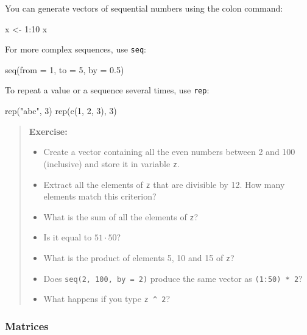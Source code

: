 \documentclass[
  letterpaper,
  DIV=11,
  numbers=noendperiod]{scrreprt}
\newenvironment{Shaded}{\begin{snugshade}}{\end{snugshade}}
\newcommand{\NormalTok}[1]{\textcolor[rgb]{0.00,0.23,0.31}{#1}}
\providecommand{\tightlist}{%
  \setlength{\itemsep}{0pt}\setlength{\parskip}{0pt}}\usepackage{longtable,booktabs,array}
\begin{document}
You can generate vectors of sequential numbers using the colon command:

\begin{Shaded}
\begin{Highlighting}[]
\NormalTok{x \textless{}{-} 1:10}
\NormalTok{x}
\end{Highlighting}
\end{Shaded}

For more complex sequences, use \texttt{seq}:

\begin{Shaded}
\begin{Highlighting}[]
\NormalTok{seq(from = 1, to = 5, by = 0.5)}
\end{Highlighting}
\end{Shaded}

To repeat a value or a sequence several times, use \texttt{rep}:

\begin{Shaded}
\begin{Highlighting}[]
\NormalTok{rep("abc", 3)}
\NormalTok{rep(c(1, 2, 3), 3)}
\end{Highlighting}
\end{Shaded}

\begin{quote}
\textbf{Exercise:}

\begin{itemize}
\tightlist
\item
  Create a vector containing all the even numbers between 2 and 100
  (inclusive) and store it in variable \texttt{z}.
\item
  Extract all the elements of \texttt{z} that are divisible by 12. How
  many elements match this criterion?
\item
  What is the sum of all the elements of \texttt{z}?
\item
  Is it equal to \(51 \cdot 50\)?
\item
  What is the product of elements 5, 10 and 15 of \texttt{z}?
\item
  Does \texttt{seq(2,\ 100,\ by\ =\ 2)} produce the same vector as
  \texttt{(1:50)\ *\ 2}?
\item
  What happens if you type \texttt{z\ \^{}\ 2}?
\end{itemize}
\end{quote}

\subsubsection*{Matrices}\label{matrices}
\end{document}
